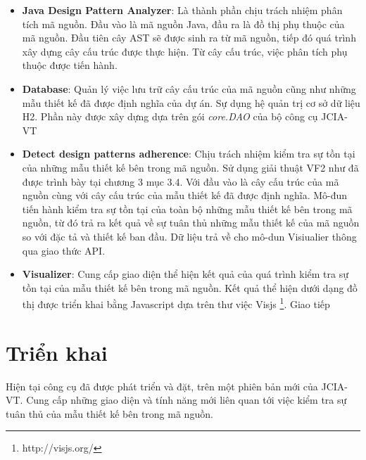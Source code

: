 \documentclass[12pt]{report}
\begin{document}
\begin{itemize}
	\item \noindent \textbf{Java Design Pattern Analyzer}: Là thành phần chịu trách nhiệm phân tích mã nguồn. Đầu vào là mã nguồn Java, đầu ra là đồ thị phụ thuộc của mã nguồn. Đầu tiên cây AST sẽ được sinh ra từ mã nguồn, tiếp đó quá trình xây dựng cây cấu trúc được thực hiện. Từ cây cấu trúc, việc phân tích phụ thuộc được tiến hành.
	\item \noindent \textbf{Database}: Quản lý việc lưu trữ cây cấu trúc của mã nguồn cũng như những mẫu thiết kế đã được định nghĩa của dự án. Sự dụng hệ quản trị cơ sở dữ liệu H2. Phần này được xây dựng dựa trên gói \textit{core.DAO} của bộ công cụ JCIA-VT
	\item \noindent \textbf{Detect design patterns adherence}: Chịu trách nhiệm kiểm tra sự tồn tại của những mẫu thiết kế bên trong mã nguồn. Sử dụng giải thuật VF2 như đã được trình bày tại chương 3 mục 3.4. Với đầu vào là cây cấu trúc của mã nguồn cùng với cây cấu trúc của mẫu thiết kế đã được định nghĩa. Mô-đun tiến hành kiểm tra sự tồn tại của toàn bộ những mẫu thiết kế bên trong mã nguồn, từ đó trả ra kết quả về sự tuân thủ những mẫu thiết kế của mã nguồn so với đặc tả và thiết kế ban đầu. Dữ liệu trả về cho mô-dun Visiualier thông qua giao thức API.
	\item \noindent \textbf{Visualizer}: Cung cấp giao diện thể hiện kết quả của quá trình kiểm tra sự tồn tại của mẫu thiết kế bên trong mã nguồn. Kết quả thể hiện dưới dạng đồ thị được triển khai bằng Javascript dựa trên thư việc Visjs \footnote{http://visjs.org/}. Giao tiếp          
\end{itemize}
\section{Triển khai}
Hiện tại công cụ đã được phát triển và đặt, trên một phiên bản mới của JCIA-VT. Cung cấp những giao diện và tính năng mới liên quan tới việc kiểm tra sự tuân thủ của mẫu thiết kế bên trong mã nguồn.
\end{document}
